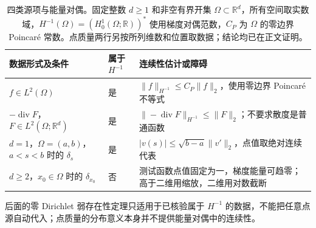 \begin{table}[htbp]
\centering
\small
\caption[四类源项与能量对偶]{四类源项与能量对偶。固定整数 \(d\geq1\) 和非空有界开集 \(\Omega\subset\mathbb R^d\)，所有空间取实数域，\(H^{-1}(\Omega)=(H_0^1(\Omega;\mathbb R))^*\) 使用梯度对偶范数，\(C_P\) 为 \(\Omega\) 的零边界 Poincaré 常数。点质量两行另按所列维数和位置取数据；结论均已在正文证明。}
\label{b2:tab:15-source-classes}
\begin{tabularx}{\linewidth}{@{}>{\raggedright\arraybackslash}p{3.8cm}>{\centering\arraybackslash}p{1.5cm}>{\raggedright\arraybackslash}X@{}}
\toprule
数据形式及条件 & 属于 \(H^{-1}\) & 连续性估计或障碍 \\
\midrule
\(f\in L^2(\Omega)\) & 是 & \(\|f\|_{H^{-1}}\leq C_P\|f\|_2\)，使用零边界 Poincaré 不等式 \\
\(-\operatorname{div}F\)，\(F\in L^2(\Omega;\mathbb R^d)\) & 是 & \(\|-\operatorname{div}F\|_{H^{-1}}\leq\|F\|_2\)；不要求散度是普通函数 \\
\(d=1\)，\(\Omega=(a,b)\)，\(a<s<b\) 时的 \(\delta_s\) & 是 & \(|v(s)|\leq\sqrt{b-a}\|v'\|_2\)，点值取绝对连续代表 \\
\(d\geq2\)，\(x_0\in\Omega\) 时的 \(\delta_{x_0}\) & 否 & 测试函数点值固定为一，梯度能量可趋零；高于二维用缩放，二维用对数截断 \\
\bottomrule
\end{tabularx}
\end{table}

后面的零 Dirichlet 弱存在性定理只适用于已核验属于 \(H^{-1}\) 的数据，不能把任意点源自动代入；点质量的分布意义本身并不提供能量对偶中的连续性。
